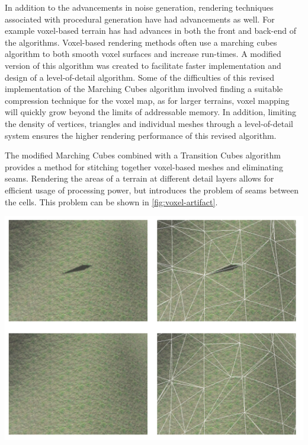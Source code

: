 \documentclass[10pt]{report}
\begin{document}
		In addition to the advancements in noise generation, rendering techniques associated with procedural generation have had advancements as well. For example voxel-based terrain has had advances in both the front and back-end of the algorithms. Voxel-based rendering methods often use a marching cubes algorithm to both smooth voxel surfaces and increase run-times. A modified version of this algorithm was created to facilitate faster implementation and design of a level-of-detail algorithm. Some of the difficulties of this revised implementation of the Marching Cubes algorithm involved finding a suitable compression technique for the voxel map, as for larger terrains, voxel mapping will quickly grow beyond the limits of addressable memory. In addition, limiting the density of vertices, triangles and individual meshes through a level-of-detail system ensures the higher rendering performance of this revised algorithm. 
		
		The modified Marching Cubes combined with a Transition Cubes algorithm provides a method for stitching together voxel-based meshes and eliminating seams. Rendering the areas of a terrain at different detail layers allows for efficient usage of processing power, but introduces the problem of seams between the cells. This problem can be shown in \autoref{fig:voxel-artifact}. 
		
		\begin{minipage}{\textwidth}
			\centering
			\includegraphics[scale=.75]{voxel-seam}
			\label{fig:voxel-artifact}
		\end{minipage}
		
\end{document}
